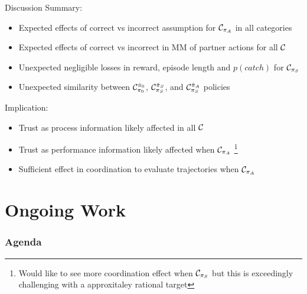 \documentclass[aspectratio=1610, xcolor=dvipsnames]{packages/beamer}
\newcommand{\displayTOC}{\begin{frame}\frametitle{Agenda} \tableofcontents[currentsection, subsectionstyle=show/show/hide]\end{frame}}
\begin{document}
\newcommand{\rawcond}[2]{\mathcal{C}^{#1}_{#2}}

\begin{frame}{Discussion}
    Summary:
    \begin{itemize}
        \item Expected effects of correct vs incorrect assumption for $\cond[][A]$ in all categories
        \item Expected effects of correct vs incorrect in MM of partner actions for all $\cond[][]$
        \item Unexpected negligible losses in reward, episode length and $p(catch)$ for $\cond[][S]$
        \item Unexpected similarity between $\cond[0][0]$, $\cond[S][S]$, and $\cond[A][S]$ policies
    \end{itemize}
    Implication:
    \begin{itemize}
        \item Trust as process information likely affected in all $\cond[][]$
        \item Trust as performance information likely affected when $\cond[][A]$
            \footnote{Would like to see more coordination effect when  $\cond[][S]$ but this is exceedingly challenging with a approxitaley rational target}
        \item Sufficient effect in coordination to evaluate trajectories when $\cond[][A]$
    \end{itemize}
\end{frame}

\section{Ongoing Work} \displayTOC
\end{document}
